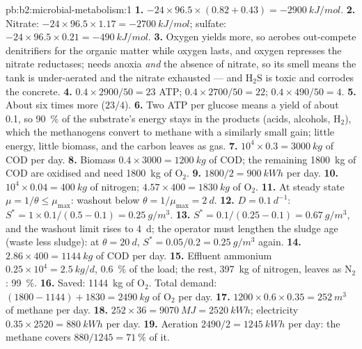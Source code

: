 \begin{solution}{pb:b2:microbial-metabolism:1}
\textbf{1.} $-24\times 96.5\times (0.82 + 0.43) = \qty{-2900}{kJ/mol}$.
\textbf{2.} Nitrate: $-24\times 96.5\times 1.17 = \qty{-2700}{kJ/mol}$;
sulfate: $-24\times 96.5\times 0.21 = \qty{-490}{kJ/mol}$.
\textbf{3.} Oxygen yields more, so aerobes out-compete denitrifiers
for the organic matter while oxygen lasts, and oxygen represses the
nitrate reductases;  needs anoxia \emph{and} the
absence of nitrate, so its smell means the tank is under-aerated and
the nitrate exhausted --- and $\mathrm{H_2S}$ is toxic and corrodes
the concrete.
\textbf{4.} $0.4\times 2900/50 = 23$ ATP; $0.4\times 2700/50 = 22$;
$0.4\times 490/50 = 4$.
\textbf{5.} About six times more ($23/4$).
\textbf{6.} Two ATP per glucose means a yield of about \num{0.1}, so
\qty{90}{\%} of the substrate's energy stays in the products (acids,
alcohols, $\mathrm{H_2}$), which the methanogens convert to methane
with a similarly small gain; little energy, little biomass, and the
carbon leaves as gas.
\textbf{7.} $10^4\times 0.3 = \qty{3000}{kg}$ of COD per day.
\textbf{8.} Biomass $0.4\times 3000 = \qty{1200}{kg}$ of COD; the
remaining \qty{1800}{kg} of COD are oxidised and need \qty{1800}{kg}
of $\mathrm{O_2}$.
\textbf{9.} $1800/2 = \qty{900}{kWh}$ per day.
\textbf{10.} $10^4\times 0.04 = \qty{400}{kg}$ of nitrogen;
$4.57\times 400 = \qty{1830}{kg}$ of $\mathrm{O_2}$.
\textbf{11.} At steady state $\mu = 1/\theta \le \mu_{\max}$: washout
below $\theta = 1/\mu_{\max} = \qty{2}{d}$.
\textbf{12.} $D = \qty{0.1}{d^{-1}}$: $S^* = 1\times 0.1/(0.5 - 0.1)
= \qty{0.25}{g/m^3}$.
\textbf{13.} $S^* = 0.1/(0.25 - 0.1) = \qty{0.67}{g/m^3}$, and the
washout limit rises to \qty{4}{d}; the operator must lengthen the
sludge age (waste less sludge): at $\theta = \qty{20}{d}$, $S^* =
0.05/0.2 = \qty{0.25}{g/m^3}$ again.
\textbf{14.} $2.86\times 400 = \qty{1144}{kg}$ of COD per day.
\textbf{15.} Effluent ammonium $0.25\times 10^4 = \qty{2.5}{kg/d}$,
\qty{0.6}{\%} of the load; the rest, \qty{397}{kg} of nitrogen,
leaves as $\mathrm{N_2}$: \qty{99}{\%}.
\textbf{16.} Saved: \qty{1144}{kg} of $\mathrm{O_2}$. Total demand:
$(1800 - 1144) + 1830 = \qty{2490}{kg}$ of $\mathrm{O_2}$ per day.
\textbf{17.} $1200\times 0.6\times 0.35 = \qty{252}{m^3}$ of methane
per day.
\textbf{18.} $252\times 36 = \qty{9070}{MJ} = \qty{2520}{kWh}$;
electricity $0.35\times 2520 = \qty{880}{kWh}$ per day.
\textbf{19.} Aeration $2490/2 = \qty{1245}{kWh}$ per day: the methane
covers $880/1245 = \qty{71}{\%}$ of it.

\end{solution}
